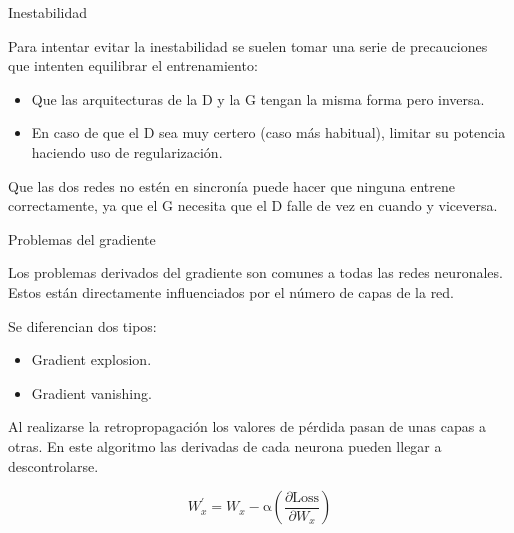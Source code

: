 \begin{frame}{Inestabilidad}
    
    Para intentar evitar la \alert{inestabilidad} se suelen tomar una serie de \alert{precauciones} que intenten \alert{equilibrar el entrenamiento}:
    
    \begin{itemize}
        \item Que las \alert{arquitecturas} de la D y la G tengan la \alert{misma forma} pero inversa.
        \item En caso de que el D sea muy \alert{certero} (caso más habitual), limitar su potencia haciendo uso de \alert{regularización}.
    \end{itemize}
    
    Que las dos redes no estén en \alert{sincronía} puede hacer que ninguna entrene correctamente, ya que el G \alert{necesita} que el D falle de vez en cuando y viceversa.
    
\end{frame}

\begin{frame}{Problemas del gradiente}

    Los problemas \alert{derivados del gradiente} son comunes a todas las redes neuronales. Estos están \alert{directamente influenciados} por el número de capas de la red.
    
    Se diferencian dos tipos:
    \begin{itemize}
        \item Gradient explosion.
        \item Gradient vanishing.
    \end{itemize}
    
    Al realizarse la \alert{retropropagación} los \alert{valores de pérdida} pasan de unas capas a otras. En este algoritmo las derivadas de cada neurona pueden llegar a \alert{descontrolarse}.
    
    \begin{equation}
        W_{x}^{\prime}=W_{x}-\mathrm{\alpha}\left(\frac{\partial \text {Loss}}{\partial W_{x}}\right)
    \end{equation}
    
\end{frame}

